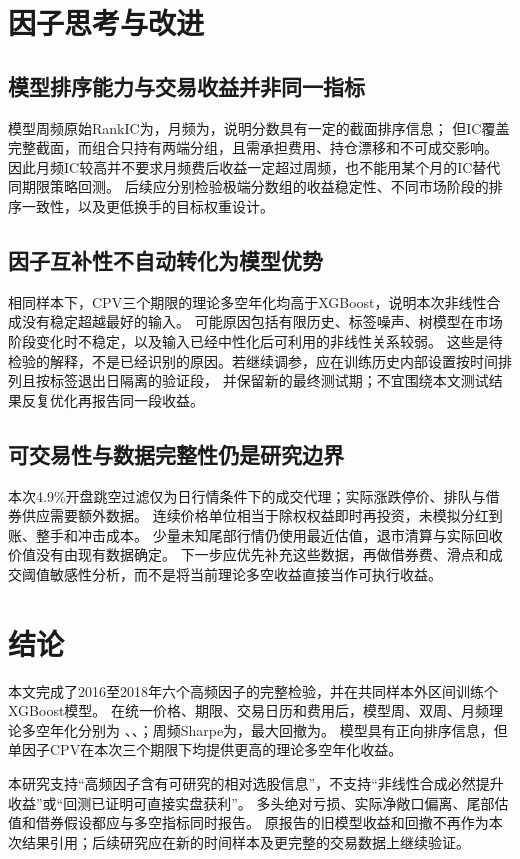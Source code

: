 \documentclass[UTF8,zihao=-4,fontset=fandol]{ctexart}
\begin{document}
\clearpage
\section{因子思考与改进}
\subsection{模型排序能力与交易收益并非同一指标}
模型周频原始RankIC为\ModelWeekRank，月频为\ModelMonthRank，说明分数具有一定的截面排序信息；
但IC覆盖完整截面，而组合只持有两端分组，且需承担费用、持仓漂移和不可成交影响。
因此月频IC较高并不要求月频费后收益一定超过周频，也不能用某个月的IC替代同期限策略回测。
后续应分别检验极端分数组的收益稳定性、不同市场阶段的排序一致性，以及更低换手的目标权重设计。

\subsection{因子互补性不自动转化为模型优势}
相同样本下，CPV三个期限的理论多空年化均高于XGBoost，说明本次非线性合成没有稳定超越最好的输入。
可能原因包括有限历史、标签噪声、树模型在市场阶段变化时不稳定，以及输入已经中性化后可利用的非线性关系较弱。
这些是待检验的解释，不是已经识别的原因。若继续调参，应在训练历史内部设置按时间排列且按标签退出日隔离的验证段，
并保留新的最终测试期；不宜围绕本文测试结果反复优化再报告同一段收益。

\subsection{可交易性与数据完整性仍是研究边界}
本次4.9\%开盘跳空过滤仅为日行情条件下的成交代理；实际涨跌停价、排队与借券供应需要额外数据。
连续价格单位相当于除权权益即时再投资，未模拟分红到账、整手和冲击成本。
少量未知尾部行情仍使用最近估值，退市清算与实际回收价值没有由现有数据确定。
下一步应优先补充这些数据，再做借券费、滑点和成交阈值敏感性分析，而不是将当前理论多空收益直接当作可执行收益。

\section{结论}
本文完成了2016至2018年六个高频因子的完整检验，并在共同样本外区间训练\ModelsCount 个XGBoost模型。
在统一价格、期限、交易日历和费用后，模型周、双周、月频理论多空年化分别为
\ModelWeekReturn、\ModelBiweekReturn、\ModelMonthReturn；周频Sharpe为\ModelWeekSharpe，最大回撤为\ModelWeekDD。
模型具有正向排序信息，但单因子CPV在本次三个期限下均提供更高的理论多空年化收益。

本研究支持“高频因子含有可研究的相对选股信息”，不支持“非线性合成必然提升收益”或“回测已证明可直接实盘获利”。
多头绝对亏损、实际净敞口偏离、尾部估值和借券假设都应与多空指标同时报告。
原报告的旧模型收益和回撤不再作为本次结果引用；后续研究应在新的时间样本及更完整的交易数据上继续验证。
\end{document}
